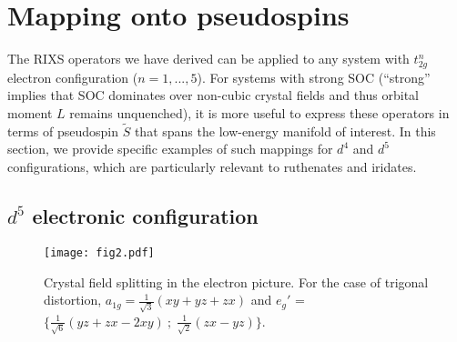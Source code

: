 \documentclass[twocolumn,prb,aps,showpacs,superscriptaddress]{revtex4-1}
\begin{document}
\section{Mapping onto pseudospins}

The RIXS operators we have derived can be applied to any system with
$t_{2g}^n$ electron configuration ($n=1,...,5$). For systems with strong 
SOC (``strong'' implies that SOC dominates over non-cubic crystal fields and
thus orbital moment $L$ remains unquenched), it is more useful to express 
these operators in terms of pseudospin $\tilde{S}$ that spans the low-energy 
manifold of interest. In this section, we provide specific examples of such 
mappings for $d^4$ and $d^5$ configurations, which are particularly relevant 
to ruthenates and iridates.   

\subsection {$d^5$ electronic configuration}

\begin{figure}
\centerline{\texttt{[image: fig2.pdf]}}
\caption{Crystal field splitting in the electron picture. For the case of
  trigonal distortion, $a_{1g}=\frac1{\sqrt3}(xy+yz+zx)$ and   
$e_g'$ = $\bigl\{ \frac1{\sqrt6}(yz+zx-2xy)
\: ;\; \frac1{\sqrt2}(zx-yz) \bigr\}$.}
\end{figure}
\end{document}
